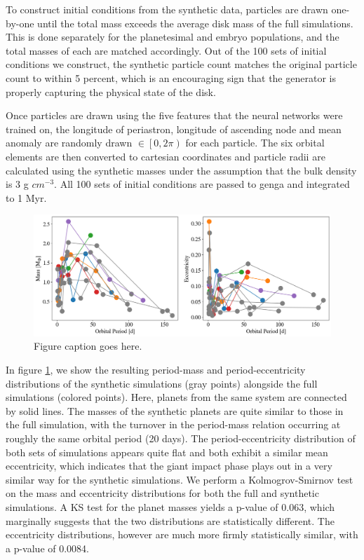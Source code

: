 To construct initial conditions from the synthetic data, particles are drawn one-by-one until the total mass exceeds the average disk mass of the full simulations. This is done separately for the planetesimal and embryo populations, and the total masses of each are matched accordingly. Out of the 100 sets of initial conditions we construct, the synthetic particle count matches the original particle count to within 5 percent, which is an encouraging sign that the generator is properly capturing the physical state of the disk.

Once particles are drawn using the five features that the neural networks were trained on, the longitude of periastron, longitude of ascending node and mean anomaly are randomly drawn $\in \left[0, 2 \pi \right)$ for each particle. The six orbital elements are then converted to cartesian coordinates and particle radii are calculated using the synthetic masses under the assumption that the bulk density is 3 g $cm^{-3}$. All 100 sets of initial conditions are passed to {\sc genga} and integrated to 1 Myr.

\begin{figure}
\begin{center}
    \includegraphics[width=\textwidth]{figures/stip/per_mass_ecc_syn_comp.png}
    \caption{Figure caption goes here.\label{fig:per_mass_ecc_syn_comp}}
\end{center}
\end{figure}

In figure \ref{fig:per_mass_ecc_syn_comp}, we show the resulting period-mass and period-eccentricity distributions of the synthetic simulations (gray points) alongside the full simulations (colored points). Here, planets from the same system are connected by solid lines. The masses of the synthetic planets are quite similar to those in the full simulation, with the turnover in the period-mass relation occurring at roughly the same orbital period (20 days). The period-eccentricity distribution of both sets of simulations appears quite flat and both exhibit a similar mean eccentricity, which indicates that the giant impact phase plays out in a very similar way for the synthetic simulations. We perform a Kolmogrov-Smirnov test on the mass and eccentricity distributions for both the full and synthetic simulations. A KS test for the planet masses yields a p-value of 0.063, which marginally suggests that the two distributions are statistically different. The eccentricity distributions, however are much more firmly statistically similar, with a p-value of 0.0084.


